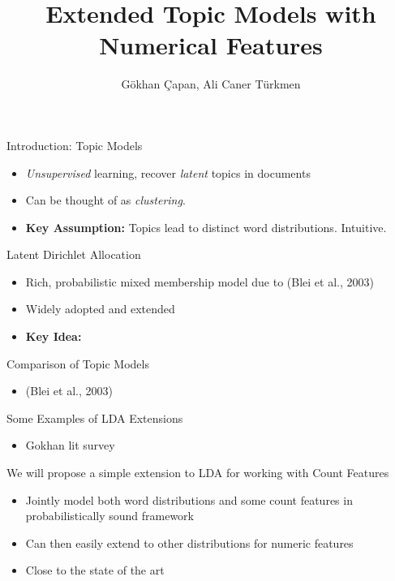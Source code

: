 \documentclass[pdf]{beamer}
\title{Extended Topic Models with Numerical Features}
\author{G\" okhan \c Capan, Ali Caner T\" urkmen}
\begin{document}
	
\begin{frame}
	\titlepage
\end{frame}

\begin{frame}{Introduction: Topic Models}
	
	\begin{itemize}
		\item {\em Unsupervised} learning, recover \emph{latent} topics in documents
		\item Can be thought of as {\em clustering}.
		\item {\bf Key Assumption:} Topics lead to distinct word distributions. Intuitive. 
	\end{itemize}
	
\end{frame}

\begin{frame}{Latent Dirichlet Allocation}
	
	\begin{itemize}
		\item Rich, probabilistic mixed membership model due to (Blei et al., 2003)
		\item Widely adopted and extended
		\item {\bf Key Idea: } 
	\end{itemize}
	
\end{frame}

\begin{frame}{Comparison of Topic Models}
	
	\begin{itemize}
		\item (Blei et al., 2003)
	\end{itemize}
	
\end{frame}

\begin{frame}{Some Examples of LDA Extensions}
	
	\begin{itemize}
		\item Gokhan lit survey
	\end{itemize}
	
\end{frame}

\begin{frame}{We will propose a simple extension to LDA for working with Count Features}
	
	\begin{itemize}
		\item Jointly model both word distributions and some count features in probabilistically sound framework
		\item Can then easily extend to other distributions for numeric features
		\item Close to the state of the art
	\end{itemize}
	
\end{frame}
\end{document}
